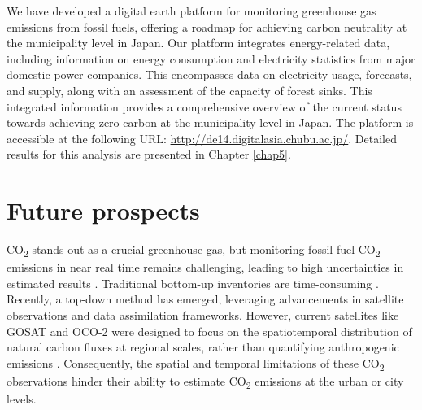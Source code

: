 We have developed a digital earth platform for monitoring greenhouse gas emissions from fossil fuels, offering a roadmap for achieving carbon neutrality at the municipality level in Japan. Our platform integrates energy-related data, including information on energy consumption and electricity statistics from major domestic power companies. This encompasses data on electricity usage, forecasts, and supply, along with an assessment of the capacity of forest sinks. This integrated information provides a comprehensive overview of the current status towards achieving zero-carbon at the municipality level in Japan. The platform is accessible at the following URL: \url{http://de14.digitalasia.chubu.ac.jp/}. Detailed results for this analysis are presented in Chapter \ref{chap5}.\par

\section{Future prospects}
CO\textsubscript{2} stands out as a crucial greenhouse gas, but monitoring fossil fuel CO\textsubscript{2} emissions in near real time remains challenging, leading to high uncertainties in estimated results \citep{marland2008uncertainties}. Traditional bottom-up inventories are time-consuming \citep{marland2008uncertainties}. Recently, a top-down method has emerged, leveraging advancements in satellite observations and data assimilation frameworks. However, current satellites like GOSAT and OCO-2 were designed to focus on the spatiotemporal distribution of natural carbon fluxes at regional scales, rather than quantifying anthropogenic emissions \citep{nassar2017quantifying, yang2023using}. Consequently, the spatial and temporal limitations of these CO\textsubscript{2} observations hinder their ability to estimate CO\textsubscript{2} emissions at the urban or city levels. \par


